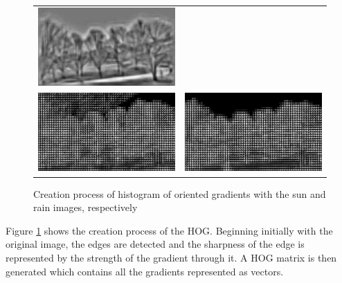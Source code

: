 \documentclass[a4paper,12pt,twoside]{report}
\begin{document}
\begin{figure}[H]
\begin{tabular}{cc}
      \includegraphics[scale=0.4]{./images/conc-machine-hog-rain.jpg} \\ 
      \includegraphics[scale=0.4]{./images/conc-hog.jpg} & 
      \includegraphics[scale=0.4]{./images/conc-hog-rain.jpg} \\
    \end{tabular}
  \caption{Creation process of histogram of oriented gradients with the sun and rain images, respectively}
  \label{hog}
\end{figure}
Figure \ref{hog} shows the creation process of the HOG. Beginning initially with the original image, the edges are detected and the sharpness of the edge is represented by the strength of the gradient through it. A HOG matrix is then generated which contains all the gradients represented as vectors.
\end{document}
